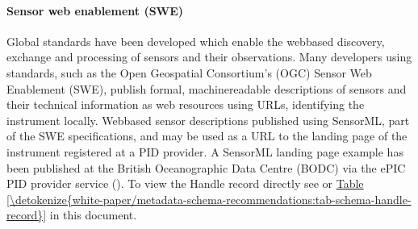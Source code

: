 \documentclass[a4paper,10pt,english]{sphinxmanual}
\begin{document}
\paragraph{Sensor web enablement (SWE)}
\label{\detokenize{white-paper/landing-page-encoding:sensor-web-enablement-swe}}\label{\detokenize{white-paper/landing-page-encoding:landing-page-encoding-swe}}
\sphinxAtStartPar
Global standards have been developed which enable the web\sphinxhyphen{}based
discovery, exchange and processing of sensors and their observations.
Many developers using standards, such as the Open Geospatial
Consortium’s (OGC) Sensor Web Enablement (SWE), publish formal,
machine\sphinxhyphen{}readable descriptions of sensors and their technical information
as web resources using URLs, identifying the instrument locally.
Web\sphinxhyphen{}based sensor descriptions published using SensorML, part of the SWE
specifications, and may be used as a URL to the landing page of the
instrument registered at a PID provider. A SensorML landing page example
has been published at the British Oceanographic Data Centre (BODC) via
the ePIC PID provider service
(). To view the Handle
record directly see
 or
\hyperref[\detokenize{white-paper/metadata-schema-recommendations:tab-schema-handle-record}]{Table \ref{\detokenize{white-paper/metadata-schema-recommendations:tab-schema-handle-record}}} in this document.
\end{document}
